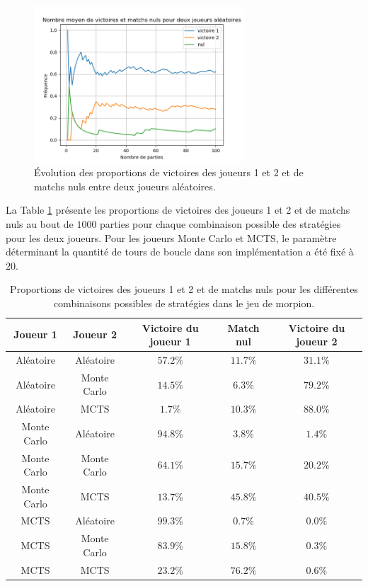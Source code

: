 \documentclass[a4paper,11pt]{article}
\begin{document}
\begin{figure}[ht]
\centering
\includegraphics[width=0.7\textwidth]{TicTacToe}
\caption{Évolution des proportions de victoires des joueurs 1 et 2 et de matchs nuls entre deux joueurs aléatoires.}
\label{FigMorpion}
\end{figure}

La Table \ref{TabMorpion} présente les proportions de victoires des joueurs 1 et 2 et de matchs nuls au bout de $1000$ parties pour chaque combinaison possible des stratégies pour les deux joueurs. Pour les joueurs Monte Carlo et MCTS, le paramètre \verb@n@ déterminant la quantité de tours de boucle dans son implémentation a été fixé à $20$.

\begin{table}[ht]
\centering
\begin{tabular}{cc|ccc}
\hline\hline
Joueur 1 & Joueur 2 & Victoire du joueur 1 & Match nul & Victoire du joueur 2 \tabularnewline
\hline
Aléatoire & Aléatoire &     $57.2\%$ & $11.7\%$ & $31.1\%$ \tabularnewline
Aléatoire & Monte Carlo &   $14.5\%$ & $6.3\%$ & $79.2\%$ \tabularnewline
Aléatoire & MCTS &          $1.7\%$ & $10.3\%$ & $88.0\%$ \tabularnewline
Monte Carlo & Aléatoire &   $94.8\%$ & $3.8\%$ & $1.4\%$ \tabularnewline
Monte Carlo & Monte Carlo & $64.1\%$ & $15.7\%$ & $20.2\%$ \tabularnewline
Monte Carlo & MCTS &        $13.7\%$ & $45.8\%$ & $40.5\%$ \tabularnewline
MCTS & Aléatoire &          $99.3\%$ & $0.7\%$ & $0.0\%$ \tabularnewline
MCTS & Monte Carlo &        $83.9\%$ & $15.8\%$ & $0.3\%$ \tabularnewline
MCTS & MCTS &               $23.2\%$ & $76.2\%$ & $0.6\%$ \tabularnewline
\hline\hline
\end{tabular}
\caption{Proportions de victoires des joueurs 1 et 2 et de matchs nuls pour les différentes combinaisons possibles de stratégies dans le jeu de morpion.}
\label{TabMorpion}
\end{table}
\end{document}
